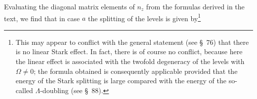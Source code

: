 Evaluating the diagonal matrix elements of $n_z$ from the formulas derived in the text, we find that in case $a$ the splitting of the levels is given by\footnote{This may appear to conflict with the general statement (see \S~76) that there is no linear Stark effect. In fact, there is of course no conflict, because here the linear effect is associated with the twofold degeneracy of the levels with $\Omega\ne0$; the formula obtained is consequently applicable provided that the energy of the Stark splitting is large compared with the energy of the so-called $\Lambda$-doubling (see \S~88).}
